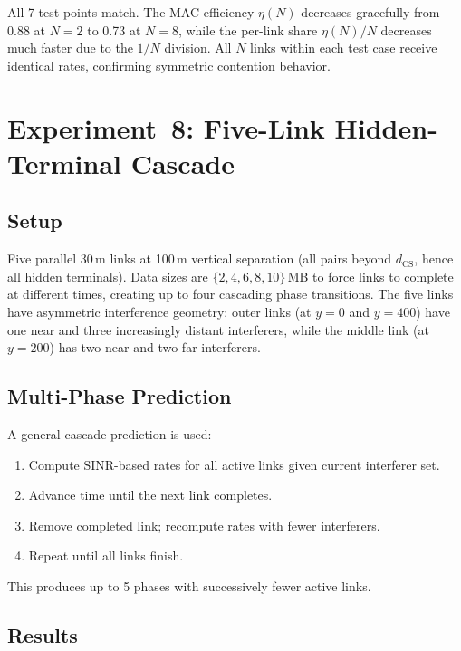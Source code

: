 \documentclass[11pt,a4paper]{article}
\begin{document}
All 7 test points match. The MAC efficiency $\eta(N)$ decreases gracefully from 0.88 at $N\!=\!2$ to 0.73 at $N\!=\!8$, while the per-link share $\eta(N)/N$ decreases much faster due to the $1/N$ division. All $N$ links within each test case receive identical rates, confirming symmetric contention behavior.

\section{Experiment~8: Five-Link Hidden-Terminal Cascade}
\label{sec:exp8}

\subsection{Setup}
Five parallel 30\,m links at 100\,m vertical separation (all pairs beyond $d_{\text{CS}}$, hence all hidden terminals). Data sizes are $\{2, 4, 6, 8, 10\}\,$MB to force links to complete at different times, creating up to four cascading phase transitions. The five links have asymmetric interference geometry: outer links (at $y=0$ and $y=400$) have one near and three increasingly distant interferers, while the middle link (at $y=200$) has two near and two far interferers.

\subsection{Multi-Phase Prediction}
A general cascade prediction is used:
\begin{enumerate}
    \item Compute SINR-based rates for all active links given current interferer set.
    \item Advance time until the next link completes.
    \item Remove completed link; recompute rates with fewer interferers.
    \item Repeat until all links finish.
\end{enumerate}
This produces up to 5 phases with successively fewer active links.

\subsection{Results}
\end{document}
